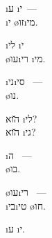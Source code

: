  \i{ע} \i{י}~—\\
\i{י} \o{זו}\i{מי}.

\i{לי}  \i{י}\\
\o{עו}\i{רי} \i{מי}.

\i{ני}\i{סי} ~—\\
 \o{נו}.

 \u{הוא} \i{לי}?\\
 \u{הוא} \i{גי}?

\i{ה}  ~—\\
 \o{בו}.

\o{עו}\i{רי} ~—\\
\i{בי}\i{טי} \o{חו}.

 \i{ע} \i{י}.
